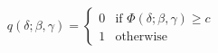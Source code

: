 \begin{equation}
  \label{eqn:chap1:kang_binarisation}
  q(\delta;\beta,\gamma) = \begin{cases}
    0 & \text{if } \Phi(\delta;\beta,\gamma) \geq c \\
    1 & \text{otherwise}
  \end{cases}
\end{equation}\\





